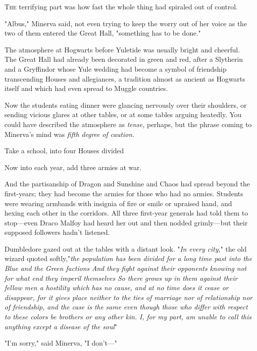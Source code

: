 
\lettrine{T}{he} terrifying part was how fast the whole thing had spiraled out of control.

"Albus," Minerva said, not even trying to keep the worry out of her voice as
the two of them entered the Great Hall, "something has to be done."

The atmosphere at Hogwarts before Yuletide was usually bright and cheerful. The
Great Hall had already been decorated in green and red, after a Slytherin and a
Gryffindor whose Yule wedding had become a symbol of friendship transcending
Houses and allegiances, a tradition almost as ancient as Hogwarts itself and
which had even spread to Muggle countries.

Now the students eating dinner were glancing nervously over their shoulders, or
sending vicious glares at other tables, or at some tables arguing heatedly. You
could have described the atmosphere as \emph{tense,} perhaps, but the phrase
coming to Minerva's mind was \emph{fifth degree of caution.}

Take a school, into four Houses divided{\el}

Now into each year, add three armies at war.

And the partisanship of Dragon and Sunshine and Chaos had spread beyond the
first-years; they had become the armies for those who had no armies. Students
were wearing armbands with insignia of fire or smile or upraised hand, and
hexing each other in the corridors. All three first-year generals had told them
to stop---even Draco Malfoy had heard her out and then nodded grimly---but
their supposed followers hadn't listened.

Dumbledore gazed out at the tables with a distant look. "\emph{In every city,}"
the old wizard quoted softly,"\emph{the population has been divided for a long
time past into the Blue and the Green factions{\el} And they fight against
their opponents knowing not for what end they imperil themselves{\el} So
there grows up in them against their fellow men a hostility which has no cause,
and at no time does it cease or disappear, for it gives place neither to the
ties of marriage nor of relationship nor of friendship, and the case is the
same even though those who differ with respect to these colors be brothers or
any other kin. I, for my part, am unable to call this anything except a disease
of the soul{\el}}"

"I'm sorry," said Minerva, "I don't---"

